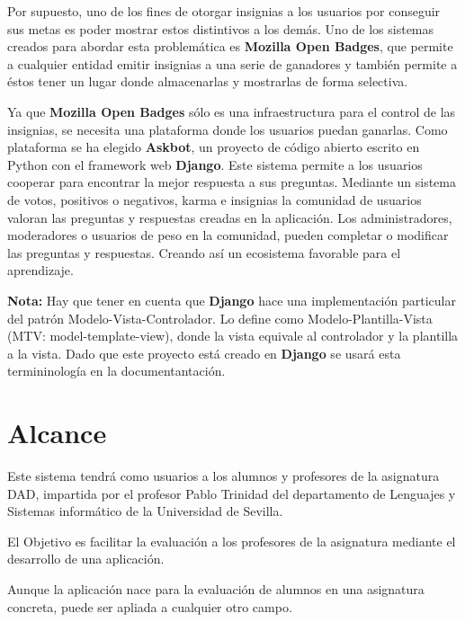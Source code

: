 	Por supuesto, uno de los fines de otorgar insignias a los usuarios por conseguir sus metas es poder mostrar estos distintivos a los demás. Uno de los sistemas creados para abordar esta problemática es \textbf{Mozilla Open Badges}, que permite a cualquier entidad emitir insignias a una serie de ganadores y también permite a éstos tener un lugar donde almacenarlas y mostrarlas de forma selectiva.

	Ya que \textbf{Mozilla Open Badges} sólo es una infraestructura para el control de las insignias, se necesita una plataforma donde los usuarios puedan ganarlas. Como plataforma se ha elegido \textbf{Askbot}, un proyecto de código abierto escrito en Python con el framework web \textbf{Django}. Este sistema permite a los usuarios cooperar para encontrar la mejor respuesta a sus preguntas. Mediante un sistema de votos, positivos o negativos, karma e insignias la comunidad de usuarios valoran las preguntas y respuestas creadas en la aplicación. Los administradores, moderadores o usuarios de peso en la comunidad, pueden completar o modificar las preguntas y respuestas. Creando así un ecosistema favorable para el aprendizaje.

	\textbf{Nota:} Hay que tener en cuenta que \textbf{Django} hace una implementación particular del patrón Modelo-Vista-Controlador. Lo define como Modelo-Plantilla-Vista (MTV: model-template-view), donde la vista equivale al controlador y la plantilla a la vista. Dado que este proyecto está creado en \textbf{Django} se usará esta termininología en la documentantación.

\section{Alcance}
	Este sistema tendrá como usuarios a los alumnos y profesores de la asignatura DAD, impartida por el profesor Pablo Trinidad del departamento de Lenguajes y Sistemas informático de la Universidad de Sevilla.

	El Objetivo es facilitar la evaluación a los profesores de la asignatura mediante el desarrollo de una aplicación.

	Aunque la aplicación nace para la evaluación de alumnos en una asignatura concreta, puede ser apliada a cualquier otro campo.

